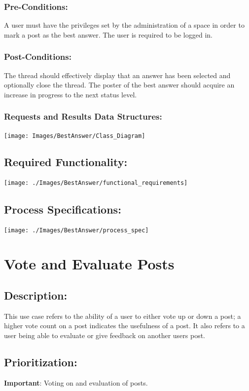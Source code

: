 \documentclass[a4paper,11pt]{article}
\begin{document}
\subsubsection*{Pre-Conditions:}
A user must have the privileges set by the administration of a space in order to mark a post as the best answer. The user is required to be logged in.
\subsubsection*{Post-Conditions:}
The thread should effectively display that an answer has been selected and optionally close the thread. The poster of the best answer should acquire an increase in progress to the next status level.
\subsubsection*{Requests and Results Data Structures:}
\texttt{[image: Images/BestAnswer/Class\_Diagram]}
\subsection{Required Functionality:} 
\begin{center}
\texttt{[image: ./Images/BestAnswer/functional\_requirements]}
\end{center}
\subsection{Process Specifications:} 
\begin{center}
\texttt{[image: ./Images/BestAnswer/process\_spec]}
\end{center}

\section{Vote and Evaluate Posts}
\subsection*{Description:}
This use case refers to the ability of a user to either vote up or down a post; a higher vote count on a post indicates the usefulness of a post. It also refers to a user being able to evaluate or give feedback on another users post.
\subsection{Prioritization:} 
\textbf{Important}: Voting on and evaluation of posts.
\end{document}
